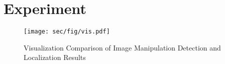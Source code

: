 \section{Experiment}
\begin{figure*}[t]
	\centering
	\texttt{[image: sec/fig/vis.pdf]}
	\caption{ Visualization Comparison of Image Manipulation Detection and Localization Results}
	\label{vis}
\end{figure*}






% 
% 



 

    
    
    



